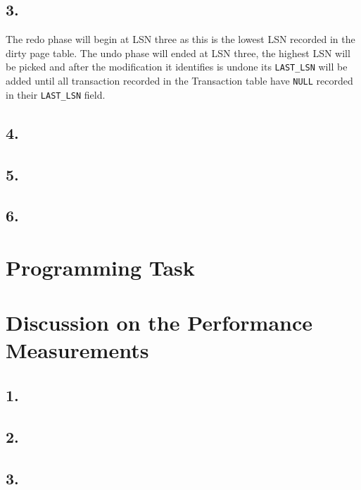\documentclass[12pt]{article}
\begin{document}
\subsection*{3.}
The redo phase will begin at LSN three as this is the lowest LSN recorded in the dirty page table. The undo phase will ended at LSN three, the highest LSN will be picked and after the modification it identifies is undone its \texttt{LAST\_LSN} will be added until all transaction recorded in the Transaction table have \texttt{NULL} recorded in their \texttt{LAST\_LSN} field.
\subsection*{4.}

\subsection*{5.}
\subsection*{6.}
\section*{Programming Task}
\section*{Discussion on the Performance Measurements}
\subsection*{1.}
\subsection*{2.}
\subsection*{3.}
\end{document}
